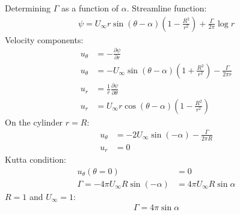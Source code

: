 \documentclass[11pt]{article}
\begin{document}
Determining $\Gamma$ as a function of $\alpha$. Streamline function:
\begin{align}
  \psi = U_{\infty}r \sin\left(\theta-\alpha\right) \left(1 - \frac{R^2}{r^2}\right) + \frac{\Gamma}{2\pi}\log r
\end{align}
Velocity components:
\begin{align}
  u_{\theta} &= -\frac{\partial \psi}{\partial r}\\
  u_{\theta} &= -U_{\infty} \sin\left(\theta-\alpha\right) \left(1 + \frac{R^2}{r^2}\right) - \frac{\Gamma}{2\pi r}\\
  u_r &= \frac{1}{r} \frac{\partial \psi}{\partial \theta}\\
  u_r &= U_{\infty} r\cos\left(\theta-\alpha\right) \left(1-\frac{R^2}{r^2}\right)
\end{align}
On the cylinder $r=R$:
\begin{align}
  u_{\theta} &= -2U_{\infty} \sin\left(-\alpha\right) - \frac{\Gamma}{2\pi R}\\
  u_r &= 0
\end{align}
Kutta condition:
\begin{align}
  u_{\theta} \left(\theta = 0\right) &= 0\\
  \Gamma = -4\pi U_{\infty} R \sin\left(-\alpha\right) &= 4\pi U_{\infty} R\sin\alpha
\end{align}
$R=1$ and $U_{\infty} =1$:
\begin{align}
  \Gamma = 4\pi \sin\alpha
\end{align}
\end{document}
